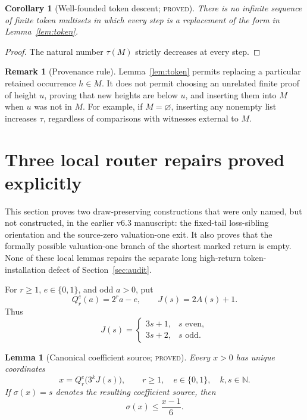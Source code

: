 \documentclass[11pt]{article}
\newtheorem{lemma}[theorem]{Lemma}
\newtheorem{corollary}[theorem]{Corollary}
\theoremstyle{definition}
\newtheorem{remark}[theorem]{Remark}
\newcommand{\N}{\mathbb N}
\newcommand{\proved}{\textsc{proved}}
\begin{document}
\begin{corollary}[Well-founded token descent; \proved]
There is no infinite sequence of finite token multisets in which every step
is a replacement of the form in Lemma~\ref{lem:token}.
\end{corollary}

\begin{proof}
The natural number $\tau(M)$ strictly decreases at every step.
\end{proof}

\begin{remark}[Provenance rule]
Lemma~\ref{lem:token} permits replacing a particular retained occurrence
$h\in M$.  It does not permit choosing an unrelated finite proof of height
$u$, proving that new heights are below $u$, and inserting them into $M$ when
$u$ was not in $M$.  For example, if $M=\varnothing$, inserting any nonempty
list increases $\tau$, regardless of comparisons with witnesses external to
$M$.
\end{remark}

\section{Three local router repairs proved explicitly}
\label{sec:local-repairs}

This section proves two draw-preserving constructions that were only named,
but not constructed, in the earlier v6.3 manuscript: the fixed-tail
loss-sibling orientation and the source-zero valuation-one exit.  It also
proves that the formally possible valuation-one branch of the shortest marked
return is empty.  None of these local lemmas repairs the separate long
high-return token-installation defect of Section~\ref{sec:audit}.

For $r\ge1$, $e\in\{0,1\}$, and odd $a>0$, put
\[
  Q_r^e(a)=2^r a-e,
  \qquad J(s)=2A(s)+1.
\]
Thus
\[
 J(s)=\begin{cases}3s+1,&s\text{ even},\\3s+2,&s\text{ odd}.
 \end{cases}
\]

\begin{lemma}[Canonical coefficient source; \proved]
\label{lem:canonical-source}
Every $x>0$ has unique coordinates
\[
 x=Q_r^e\bigl(3^kJ(s)\bigr),
 \qquad r\ge1,\quad e\in\{0,1\},\quad k,s\in\N.
\]
If $\sigma(x)=s$ denotes the resulting coefficient source, then
\[
 \sigma(x)\le \frac{x-1}{6}.
\]
\end{lemma}
\end{document}
